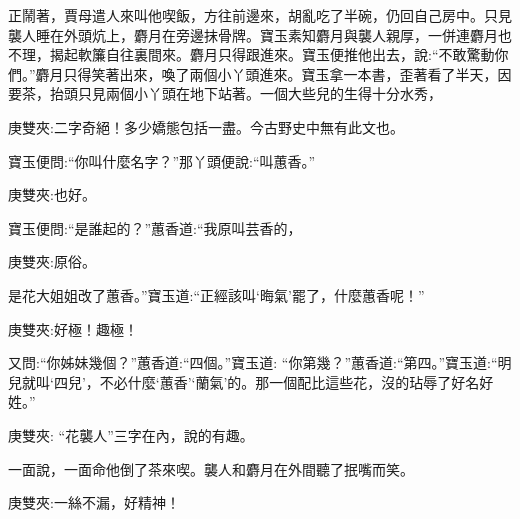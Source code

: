 \begin{parag}
    正鬧著，賈母遣人來叫他喫飯，方往前邊來，胡亂吃了半碗，仍回自己房中。只見襲人睡在外頭炕上，麝月在旁邊抹骨牌。寶玉素知麝月與襲人親厚，一併連麝月也不理，揭起軟簾自往裏間來。麝月只得跟進來。寶玉便推他出去，說:“不敢驚動你們。”麝月只得笑著出來，喚了兩個小丫頭進來。寶玉拿一本書，歪著看了半天，因要茶，抬頭只見兩個小丫頭在地下站著。一個大些兒的生得十分水秀，\begin{note}庚雙夾:二字奇絕！多少嬌態包括一盡。今古野史中無有此文也。\end{note}寶玉便問:“你叫什麼名字？”那丫頭便說:“叫蕙香。”\begin{note}庚雙夾:也好。\end{note}寶玉便問:“是誰起的？”蕙香道:“我原叫芸香的，\begin{note}庚雙夾:原俗。\end{note}是花大姐姐改了蕙香。”寶玉道:“正經該叫‘晦氣’罷了，什麼蕙香呢！”\begin{note}庚雙夾:好極！趣極！\end{note}又問:“你姊妹幾個？”蕙香道:“四個。”寶玉道: “你第幾？”蕙香道:“第四。”寶玉道:“明兒就叫‘四兒’，不必什麼‘蕙香’‘蘭氣’的。那一個配比這些花，沒的玷辱了好名好姓。”\begin{note}庚雙夾: “花襲人”三字在內，說的有趣。\end{note}一面說，一面命他倒了茶來喫。襲人和麝月在外間聽了抿嘴而笑。\begin{note}庚雙夾:一絲不漏，好精神！\end{note}
\end{parag}


